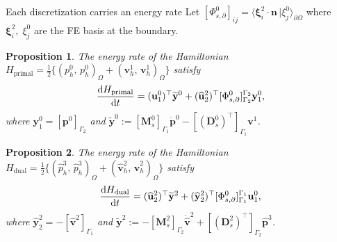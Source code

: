 \documentclass[aspectratio=169]{beamer}
\newcommand{\inpr}[3][]{\ensuremath{( #2, \, #3 )_{#1}}}
\newcommand{\dualpr}[3][]{\ensuremath{\langle #2 \, \vert #3 \rangle_{#1}}}
\newcommand*{\dual}[1]{\ensuremath{\widehat{#1}}}
\newtheorem{proposition}{Proposition}
\begin{document}
	\begin{frame}{Each discretization carries an energy rate}
		Let $[{\Phi}^{0}_{s, \partial}]_{ij} = \dualpr[\partial\Omega]{\bm{\xi}_i^2 \cdot \bm{n}}{\xi^0_j}$ where $\bm{\xi}_i^2, \; \xi^0_j$ are the FE basis at the boundary.
		\begin{proposition}
			The energy rate of the Hamiltonian $H_{\mathrm{primal}} = \frac{1}{2}\{\inpr[\Omega]{p^0_h}{p^0_h} + \inpr[\Omega]{\bm{v}^1_h}{\bm{v}^1_h}\}$ satisfy
			\begin{equation*}
				\diff{{H}_{\mathrm{primal}}}{t} = (\mathbf{u}^{0}_1)^\top \widetilde{\mathbf{y}}^{0} + (\dual{\mathbf{u}}^{2}_2)^\top[{\Phi}^{0}_{s, \partial}]_{\Gamma_2}^{\Gamma_2} \mathbf{y}^{0}_1,
			\end{equation*} 
			where ${\mathbf{y}}^{0}_1 = [\mathbf{p}^{0}]_{\Gamma_2}$ and $
			\widetilde{\mathbf{y}}^{0} := [\mathbf{M}^{0}_{s}]_{\Gamma_1} \dot{\mathbf{p}}^{0} -[(\mathbf{D}_{s}^{0})^\top]_{\Gamma_1} {\mathbf{v}}^1$.
		\end{proposition}
		
		\begin{proposition}
			The energy rate of the Hamiltonian $H_{\mathrm{dual}} = \frac{1}{2}\{\inpr[\Omega]{\dual{p}^3_h}{\dual{p}^3_h} + \inpr[\Omega]{\dual{\bm{v}}^2_h}{\dual{\bm{v}}^2_h}\}$ satisfy
			\begin{equation*}
				\diff{{H}_{\mathrm{dual}}}{t} = (\dual{\mathbf{u}}^{2}_2)^\top \widetilde{\mathbf{y}}^{2} + (\dual{\mathbf{y}}^{2}_2)^\top[{\Phi}^{0}_{s, \partial}]_{\Gamma_1}^{\Gamma_1} \mathbf{u}^{0}_1, 
			\end{equation*} 
			where $\dual{\mathbf{y}}^{2}_2 = -[\dual{\mathbf{v}}^{2}]_{\Gamma_1}$ and $\widetilde{\mathbf{y}}^{2} :=  -[\mathbf{M}^{2}_{s}]_{\Gamma_2} \dot{\dual{\mathbf{v}}}^{2}  +[(\mathbf{D}_{s}^{2})^\top]_{\Gamma_2} \dual{\mathbf{p}}^3$.
		\end{proposition}
	\end{frame}
	
\end{document}
